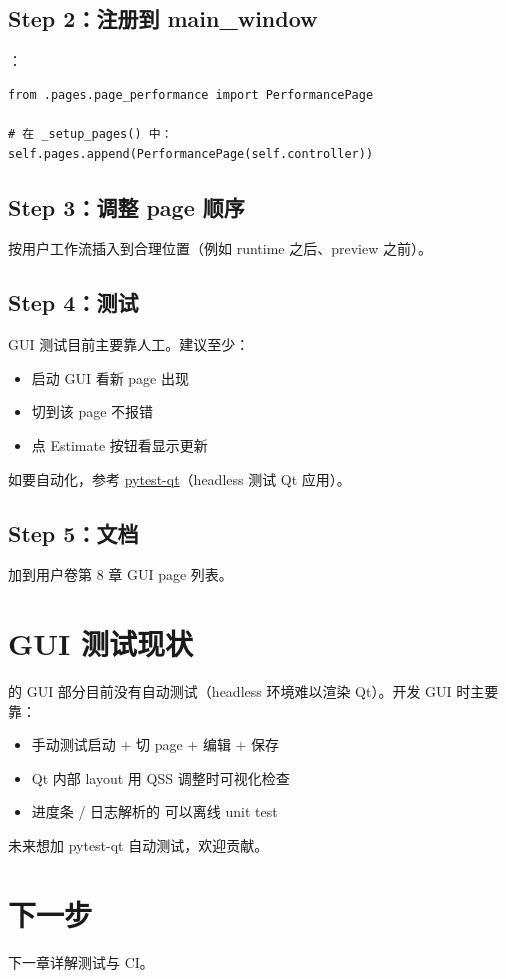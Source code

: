 \subsection{Step 2：注册到 main\_window}

：

\begin{verbatim}
from .pages.page_performance import PerformancePage

# 在 _setup_pages() 中：
self.pages.append(PerformancePage(self.controller))
\end{verbatim}

\subsection{Step 3：调整 page 顺序}

按用户工作流插入到合理位置（例如 runtime 之后、preview 之前）。

\subsection{Step 4：测试}

GUI 测试目前主要靠人工。建议至少：

\begin{itemize}
  \item 启动 GUI 看新 page 出现
  \item 切到该 page 不报错
  \item 点 Estimate 按钮看显示更新
\end{itemize}

如要自动化，参考 \href{https://pytest-qt.readthedocs.io}{pytest-qt}（headless 测试 Qt 应用）。

\subsection{Step 5：文档}

加到用户卷第 8 章 GUI page 列表。

\section{GUI 测试现状}

\openbench{} 的 GUI 部分目前没有自动测试（headless 环境难以渲染 Qt）。开发 GUI 时主要靠：

\begin{itemize}
  \item 手动测试启动 + 切 page + 编辑 + 保存
  \item Qt 内部 layout 用 QSS 调整时可视化检查
  \item 进度条 / 日志解析的  可以离线 unit test
\end{itemize}

未来想加 pytest-qt 自动测试，欢迎贡献。

\section{下一步}

下一章详解测试与 CI。

